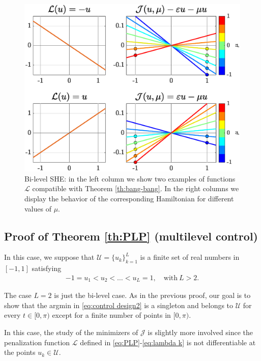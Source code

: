 \documentclass[9pt,shortpaper,twoside,web]{ieeecolor}
\begin{document}
\begin{figure}[h] 
	\centering
	\includegraphics[scale=0.415]{img/fig03.eps}
	\caption{Bi-level SHE: in the left column we show two examples of functions $\mathcal{L}$ compatible with Theorem \ref{th:bang-bang}. In the right columns we display the behavior of the corresponding Hamiltonian for different values of $\mu$.}\label{fig:Bang-Bang-penalization} 
\end{figure}

\subsection{Proof of Theorem \ref{th:PLP} (multilevel control)}\label{sec: proof:PLP}

In this case, we suppose that $\mathcal{U} = \{ u_k\}_{k=1}^L$ is a finite set of real numbers in $[-1,1]$ satisfying
\begin{align}\label{eq:order} 
	-1 = u_1 < u_2 <\ldots <u_L = 1, \quad \text{with} \ L> 2.
\end{align} 

The case $L=2$ is just the bi-level case. As in the previous proof, our goal is to show that the argmin in \eqref{eq:control design2} is a singleton and belongs to $\mathcal{U}$ for every $t\in [0,\pi)$ except for a finite number of points in $[0,\pi)$.

In this case, the study of the minimizers of $\mathcal{J}$ is slightly more involved since the penalization function $\mathcal{L}$ defined in \eqref{eq:PLP}-\eqref{eq:lambda k} is not differentiable at the points $u_k\in\mathcal U$.
\end{document}
